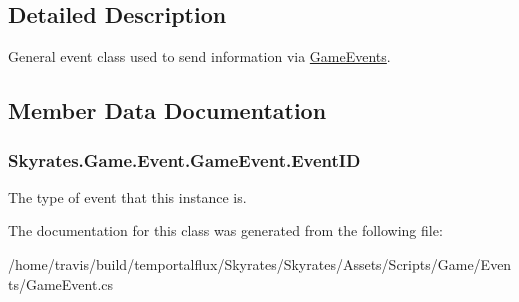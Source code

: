 \subsection{Detailed Description}
General event class used to send information via \hyperlink{class_skyrates_1_1_game_1_1_event_1_1_game_events}{Game\-Events}. 



\subsection{Member Data Documentation}
\hypertarget{class_skyrates_1_1_game_1_1_event_1_1_game_event_ad403f445789c2415602f1bef7fbc4c4f}{
\subsubsection[{Event\-I\-D}]{ Skyrates.\-Game.\-Event.\-Game\-Event.\-Event\-I\-D}}\label{class_skyrates_1_1_game_1_1_event_1_1_game_event_ad403f445789c2415602f1bef7fbc4c4f}


The type of event that this instance is. 



The documentation for this class was generated from the following file\-:\begin{DoxyCompactItemize}
\item 
/home/travis/build/temportalflux/\-Skyrates/\-Skyrates/\-Assets/\-Scripts/\-Game/\-Events/Game\-Event.\-cs\end{DoxyCompactItemize}
